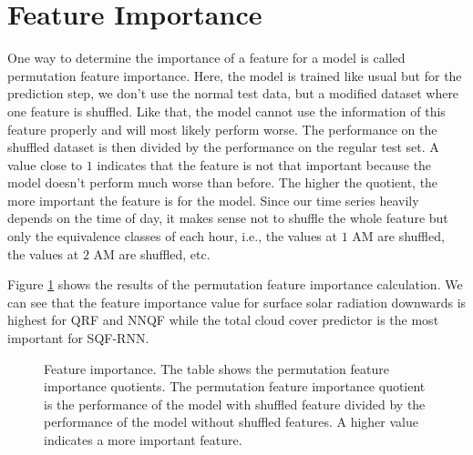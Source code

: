 \section{Feature Importance}
\label{sec:feature-importance}

One way to determine the importance of a feature for a model is called 
permutation feature importance. Here, the model is trained like usual but for the prediction 
step, we don't use the normal test data, but a modified dataset where one feature is 
shuffled. Like that, the model cannot use the information of this feature properly 
and will most likely perform worse. The performance on the shuffled dataset is 
then divided by the performance on the regular test set. A value close to \(1\) 
indicates that the feature is not that important because the model doesn't perform 
much worse than before. The higher the quotient, the more important the feature is for the model.
Since our time series heavily depends on the time of day, it makes sense 
not to shuffle the whole feature but only the equivalence classes of each hour, 
i.e., the values at \(1\) AM are shuffled, the values at \(2\) AM are shuffled, etc.

Figure \ref{fig:feature-importance} 
shows the results of the permutation feature importance calculation. 
We can see that the feature importance value for surface solar radiation downwards 
is highest for QRF and NNQF while the total cloud cover predictor is the most important 
for SQF-RNN.

\begin{figure}[h!]
    
    \caption[Feature importance]{Feature importance. 
    The table shows the permutation feature importance quotients. 
    The permutation feature importance quotient is 
    the performance of the model with shuffled feature 
    divided by the performance of the model without shuffled features. 
    A higher value indicates a more important feature.}
    \label{fig:feature-importance}
\end{figure}